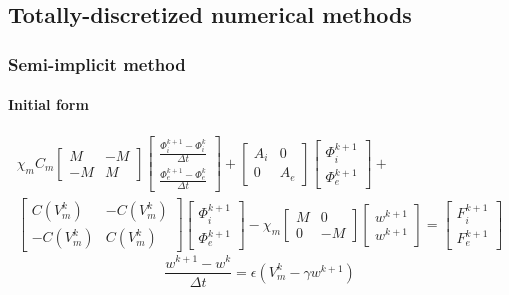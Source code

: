 \documentclass[a4paper]{article}
\begin{document}
\subsection{Totally-discretized numerical methods}
\vspace{4mm}
\subsubsection{Semi-implicit method}
\paragraph{Initial form}
\begin{equation}
\begin{gathered}
\chi_mC_m \begin{bmatrix}M &-M \\ -M & M \end{bmatrix}
\begin{bmatrix}\frac{\Phi_i^{k+1}-\Phi_i^k}{\Delta t} \\ \frac{\Phi_e^{k+1}-\Phi_e^k}{\Delta t} \end{bmatrix}
+ \begin{bmatrix}A_i & 0 \\ 0 & A_e \end{bmatrix}
\begin{bmatrix}\Phi_i^{k+1} \\ \Phi_e^{k+1} \end{bmatrix} + \\
 \begin{bmatrix}C(V_m^k) & -C(V_m^k) \\ -C(V_m^k) & C(V_m^k) \end{bmatrix} 
\begin{bmatrix} \Phi_i^{k+1} \\ \Phi_e^{k+1}  \end{bmatrix} 
-\chi_m \begin{bmatrix}M & 0 \\ 0 & -M \end{bmatrix} 
\begin{bmatrix}w^{k+1} \\ w^{k+1} \end{bmatrix} = 
\begin{bmatrix} F_i^{k+1} \\ F_e^{k+1}\end{bmatrix}
\end{gathered}
\end{equation}
\vspace{5mm}
\begin{equation}
\frac{w^{k+1}-w^k}{\Delta t} = \epsilon (V_m^k - \gamma w^{k+1})
\end{equation}
\end{document}
